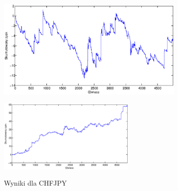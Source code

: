 \begin{figure}[h]
\begin{minipage}{.49\linewidth}
\centering
\includegraphics[width=0.82\textwidth]{images/S1d_chfjpy.eps}
\label{mansard}
\end{minipage}
\begin{minipage}{\linewidth}
\centering
\includegraphics[width=0.6\textwidth]{images/S1s_chfjpy.eps}
\label{mansard}
\end{minipage}
\caption{Wyniki dla CHFJPY}
\end{figure}
\FloatBarrier



